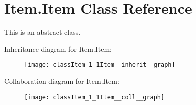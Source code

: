 \hypertarget{classItem_1_1Item}{}\section{Item.\+Item Class Reference}
\label{classItem_1_1Item}


This is an abstract class.  




Inheritance diagram for Item.\+Item\+:\nopagebreak
\begin{figure}[H]
\begin{center}
\leavevmode
\texttt{[image: classItem\_1\_1Item\_\_inherit\_\_graph]}
\end{center}
\end{figure}


Collaboration diagram for Item.\+Item\+:\nopagebreak
\begin{figure}[H]
\begin{center}
\leavevmode
\texttt{[image: classItem\_1\_1Item\_\_coll\_\_graph]}
\end{center}
\end{figure}
